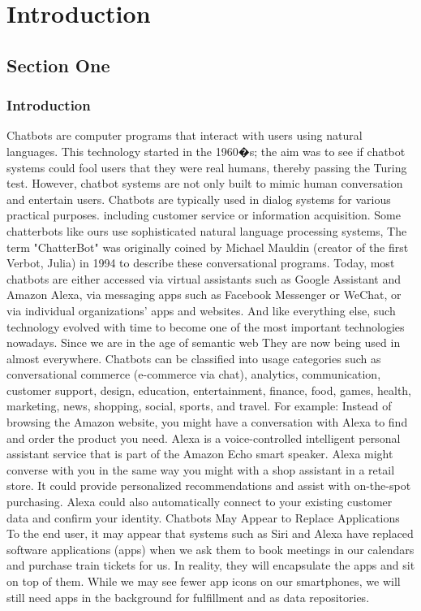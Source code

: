 
\chapter{Introduction}
\label{chap:chap1}

\section{Section One}

  \subsection{Introduction}
  


Chatbots are computer programs that interact with users using natural languages. This technology started in the 1960�s; the aim was to see if chatbot systems could fool users that they were real humans, thereby passing the Turing test. However, chatbot systems are not only built to mimic human conversation and entertain users. Chatbots are typically used in dialog systems for various practical purposes. including customer service or information acquisition. Some chatterbots like ours use sophisticated natural language processing systems,
The term "ChatterBot" was originally coined by Michael Mauldin (creator of the first Verbot, Julia) in 1994 to describe these conversational programs. Today, most chatbots are either accessed via virtual assistants such as Google Assistant and Amazon Alexa, via messaging apps such as Facebook Messenger or WeChat, or via individual organizations' apps and websites. And like everything else, such technology evolved with time to become one of the most important technologies nowadays. Since we are in the age of semantic web They are now being used in almost everywhere. Chatbots can be classified into usage categories such as conversational commerce (e-commerce via chat), analytics, communication, customer support, design, education, entertainment, finance, food, games, health, marketing, news, shopping, social, sports, and travel.
For example: Instead of browsing the Amazon website, you might have a conversation with Alexa to find and order the product you need. Alexa is a voice-controlled intelligent personal assistant service that is part of the Amazon Echo smart speaker. Alexa might converse with you in the same way you might with a shop assistant in a retail store. It could provide personalized recommendations and assist with on-the-spot purchasing. Alexa could also automatically connect to your existing customer data and confirm your identity.
Chatbots May Appear to Replace Applications To the end user, it may appear that systems such as Siri and Alexa have replaced software applications (apps) when we ask them to book meetings in our calendars and purchase train tickets for us. In reality, they will encapsulate the apps and sit on top of them. While we may see fewer app icons on our smartphones, we will still need apps in the background for fulfillment and as data repositories.

